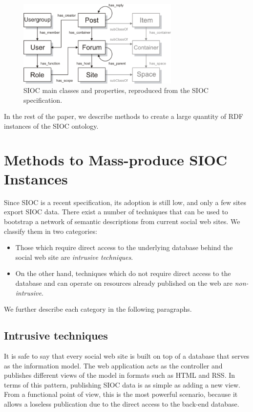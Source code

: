 \documentclass{../templates/www2008-submission}
\begin{document}
\begin{figure}
 \centering
 \includegraphics[width=8cm]{images/sioc.png}
 \caption{\label{fig:sioc}SIOC main classes and properties, reproduced from the SIOC specification.}
\end{figure}

In the rest of the paper, we describe methods to create a large
quantity of RDF instances of the SIOC ontology.


\section{Methods to Mass-produce SIOC Instances}\label{sec:taxonomy}

Since SIOC is a recent specification, its adoption is still low, and
only a few sites export SIOC data. There exist a number of techniques
that can be used to bootstrap a network of semantic descriptions from
current social web sites. We classify them in two categories:

\begin{itemize}
\item Those which require direct access to the underlying database behind
the social web site are \emph{intrusive techniques}.
\item On the other hand, techniques which do not require direct access to
the database and can operate on resources already published on the web
are \emph{non-intrusive}.
\end{itemize}

We further describe each category in the following paragraphs.

\subsection{Intrusive techniques}

It is safe to say that every social web site is built on top of a
database that serves as the information model. The web application
acts as the controller and publishes different views of the model in
formats such as HTML and RSS. In terms of this pattern, publishing
SIOC data is as simple as adding a new view.
From a functional point of view, this is the most powerful scenario, because
it allows a loseless publication due to the direct access
to the back-end database.
\end{document}

